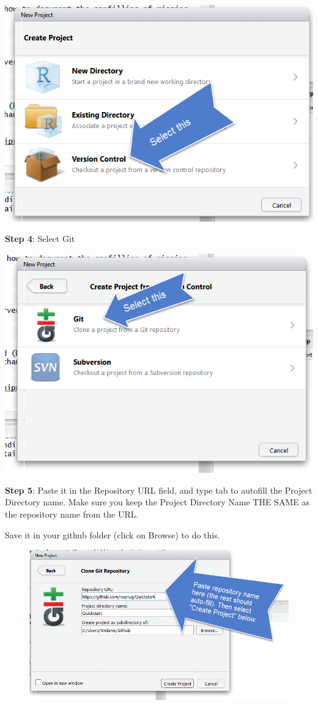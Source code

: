 \documentclass[]{book}
\theoremstyle{definition}
\theoremstyle{definition}
\theoremstyle{definition}
\theoremstyle{remark}
\begin{document}
\includegraphics{img/new_project_2.png}

\textbf{Step 4}: Select Git

\includegraphics{img/new_project_3.png}

\textbf{Step 5}: Paste it in the Repository URL field, and type tab to
autofill the Project Directory name. Make sure you keep the Project
Directory Name THE SAME as the repository name from the URL.

Save it in your github folder (click on Browse) to do this.

\begin{figure}
\centering
\includegraphics{img/new_project_4.png}
\caption{}
\end{figure}
\end{document}

